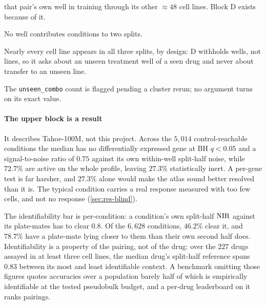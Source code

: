 \begin{table}[htbp]
\begin{fullwidth}
\begin{threeparttable}
\begin{tablenotes}[flushleft]
  that pair's own well in training through its other $\approx 48$ cell lines.
  Block D exists because of it.
  \item[d] No well contributes conditions to two splits.
  \item[e] Nearly every cell line appears in all three splits, by design: D
  withholds wells, not lines, so it asks about an unseen treatment well of a seen
  drug and never about transfer to an unseen line.
  \item The \texttt{unseen\_combo} count is flagged pending a cluster rerun; no
  argument turns on its exact value.
  \end{tablenotes}
  \end{threeparttable}
  \end{fullwidth}
  \end{table}

\paragraph{The upper block is a result} It describes Tahoe-100M, not this
project. Across the $5{,}014$ control-reachable conditions the median has no
differentially expressed gene at BH $q<0.05$ and a signal-to-noise ratio of
$0.75$ against its own within-well split-half noise, while $72.7\%$ are active
on the whole profile, leaving $27.3\%$ statistically inert. A per-gene test is
far harsher, and $27.3\%$ alone would make the atlas sound better resolved than
it is. The typical condition carries a real response
measured with too few cells, and not no response (\cref{sec:res-blind}).

The identifiability bar is per-condition: a condition's own split-half $\textrm{NIR}$
against its plate-mates has to clear $0.8$. Of the $6{,}628$ conditions,
$46.2\%$ clear it, and $78.7\%$ have a plate-mate lying closer to them than
their own second half does. Identifiability is a property of the pairing, not of
the drug: over the $227$ drugs assayed in at least three cell lines, the median
drug's split-half reference spans $0.83$ between its most and least identifiable
context. A benchmark omitting those figures
quotes accuracies over a population barely half of which is empirically
identifiable at the tested pseudobulk budget, and a per-drug leaderboard on it
ranks pairings.


